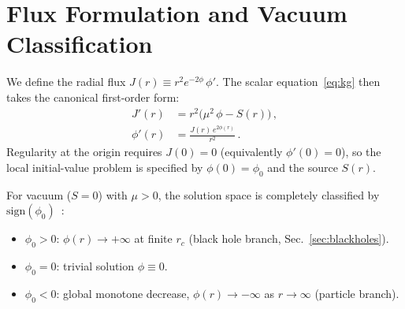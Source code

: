 \documentclass[aps,prd,twocolumn,superscriptaddress,nofootinbib,longbibliography]{revtex4-2}
\newcommand{\phiz}{\phi_0}
\begin{document}
\section{Flux Formulation and Vacuum Classification}\label{app:flux}

We define the radial flux $J(r) \equiv r^2 e^{-2\phi}\,\phi'$.  The
scalar equation~\eqref{eq:kg} then takes the canonical first-order form:
\begin{align}\label{eq:flux}
  J'(r) &= r^2\bigl(\mu^2\,\phi - S(r)\bigr)\,, \nonumber\\
  \phi'(r) &= \frac{J(r)\,e^{2\phi(r)}}{r^2}\,.
\end{align}
Regularity at the origin requires $J(0) = 0$ (equivalently
$\phi'(0) = 0$), so the local initial-value problem is specified by
$\phi(0) = \phiz$ and the source $S(r)$.

For vacuum ($S = 0$) with $\mu > 0$, the solution space is completely
classified by $\mathrm{sign}(\phiz)$~\cite{zenodo2025}:
\begin{itemize}
\item $\phiz > 0$: $\phi(r) \to +\infty$ at finite $r_c$
  (black hole branch, Sec.~\ref{sec:blackholes}).
\item $\phiz = 0$: trivial solution $\phi \equiv 0$.
\item $\phiz < 0$: global monotone decrease, $\phi(r) \to -\infty$
  as $r \to \infty$ (particle branch).
\end{itemize}

\end{document}
